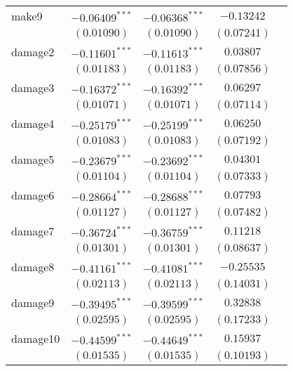 \begin{table}
\begin{center}
\begin{tabular}{l c c c c}
make9            & $-0.06409^{***}$ & $-0.06368^{***}$ & $-0.13242$       &                \\
                 & $(0.01090)$      & $(0.01090)$      & $(0.07241)$      &                \\
damage2          & $-0.11601^{***}$ & $-0.11613^{***}$ & $0.03807$        &                \\
                 & $(0.01183)$      & $(0.01183)$      & $(0.07856)$      &                \\
damage3          & $-0.16372^{***}$ & $-0.16392^{***}$ & $0.06297$        &                \\
                 & $(0.01071)$      & $(0.01071)$      & $(0.07114)$      &                \\
damage4          & $-0.25179^{***}$ & $-0.25199^{***}$ & $0.06250$        &                \\
                 & $(0.01083)$      & $(0.01083)$      & $(0.07192)$      &                \\
damage5          & $-0.23679^{***}$ & $-0.23692^{***}$ & $0.04301$        &                \\
                 & $(0.01104)$      & $(0.01104)$      & $(0.07333)$      &                \\
damage6          & $-0.28664^{***}$ & $-0.28688^{***}$ & $0.07793$        &                \\
                 & $(0.01127)$      & $(0.01127)$      & $(0.07482)$      &                \\
damage7          & $-0.36724^{***}$ & $-0.36759^{***}$ & $0.11218$        &                \\
                 & $(0.01301)$      & $(0.01301)$      & $(0.08637)$      &                \\
damage8          & $-0.41161^{***}$ & $-0.41081^{***}$ & $-0.25535$       &                \\
                 & $(0.02113)$      & $(0.02113)$      & $(0.14031)$      &                \\
damage9          & $-0.39495^{***}$ & $-0.39599^{***}$ & $0.32838$        &                \\
                 & $(0.02595)$      & $(0.02595)$      & $(0.17233)$      &                \\
damage10         & $-0.44599^{***}$ & $-0.44649^{***}$ & $0.15937$        &                \\
                 & $(0.01535)$      & $(0.01535)$      & $(0.10193)$      &                \\

\end{tabular}
\end{center}
\end{table}
